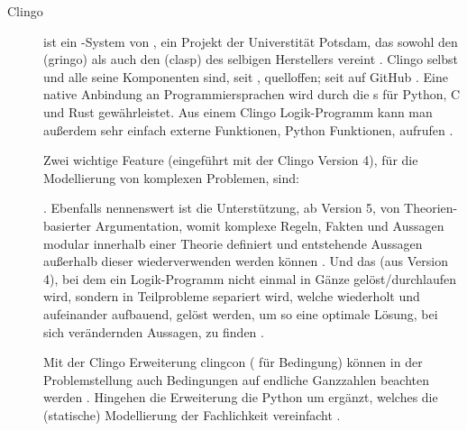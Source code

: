 \begin{description}
    \item[Clingo] ist ein -System von , ein Projekt der Universtität Potsdam, das sowohl den \sog {} (gringo) als auch den  (clasp) des selbigen Herstellers  vereint .
    Clingo selbst und alle seine Komponenten sind, seit , quelloffen;
    seit  auf GitHub .
    Eine native Anbindung an Programmiersprachen wird durch die s für Python, C und Rust gewährleistet.
    Aus einem Clingo Logik-Programm kann man außerdem sehr einfach externe Funktionen, \zB Python Funktionen, aufrufen .

    Zwei wichtige Feature (eingeführt mit der Clingo Version 4), für die Modellierung von komplexen Problemen, sind:
    .
    Ebenfalls nennenswert ist die Unterstützung, ab Version 5, von Theorien-basierter Argumentation, womit komplexe Regeln, Fakten und Aussagen modular innerhalb einer Theorie definiert und entstehende Aussagen außerhalb dieser wiederverwenden werden können .
    Und das  (aus Version 4), bei dem ein Logik-Programm nicht einmal in Gänze gelöst/durchlaufen wird, sondern in Teilprobleme separiert wird, welche wiederholt und aufeinander aufbauend, gelöst werden, um so eine optimale Lösung, bei sich verändernden Aussagen, zu finden .

    Mit der Clingo Erweiterung clingcon ( für Bedingung) können in der Problemstellung auch Bedingungen auf endliche Ganzzahlen beachten werden .
    Hingehen die Erweiterung  die Python  um  ergänzt, welches die (statische) Modellierung der Fachlichkeit vereinfacht .
\end{description}



